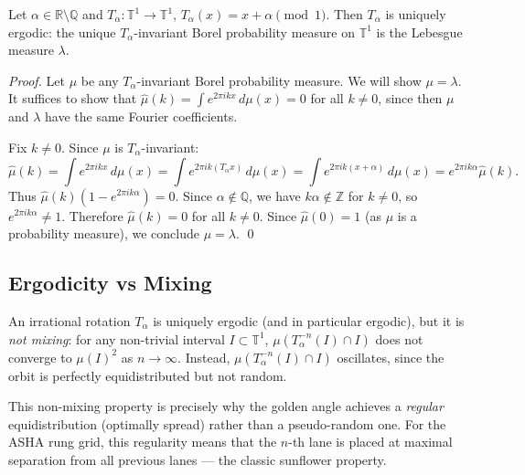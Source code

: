 \begin{theorem}\label{thm:unique-ergodic}
Let $\alpha \in \mathbb{R}\setminus\mathbb{Q}$ and $T_\alpha: \mathbb{T}^1 \to \mathbb{T}^1$,
$T_\alpha(x) = x + \alpha \pmod{1}$.
Then $T_\alpha$ is uniquely ergodic: the unique $T_\alpha$-invariant Borel probability
measure on $\mathbb{T}^1$ is the Lebesgue measure $\lambda$.
\end{theorem}

\begin{proof}
Let $\mu$ be any $T_\alpha$-invariant Borel probability measure.
We will show $\mu = \lambda$.
It suffices to show that $\hat\mu(k) = \int e^{2\pi ikx}\, d\mu(x) = 0$ for all
$k \ne 0$, since then $\mu$ and $\lambda$ have the same Fourier coefficients.

Fix $k \ne 0$.
Since $\mu$ is $T_\alpha$-invariant:
\begin{equation}
  \hat\mu(k) = \int e^{2\pi ikx}\, d\mu(x)
  = \int e^{2\pi ik(T_\alpha x)}\, d\mu(x)
  = \int e^{2\pi ik(x+\alpha)}\, d\mu(x)
  = e^{2\pi ik\alpha}\hat\mu(k).
\end{equation}
Thus $\hat\mu(k)(1 - e^{2\pi ik\alpha}) = 0$.
Since $\alpha \notin \mathbb{Q}$, we have $k\alpha \notin \mathbb{Z}$ for $k \ne 0$,
so $e^{2\pi ik\alpha} \ne 1$.
Therefore $\hat\mu(k) = 0$ for all $k \ne 0$.
Since $\hat\mu(0) = 1$ (as $\mu$ is a probability measure), we conclude $\mu = \lambda$.
\qed
\end{proof}

\subsection{Ergodicity vs Mixing}\label{subsec:ch18-mixing}

An irrational rotation $T_\alpha$ is uniquely ergodic (and in particular ergodic),
but it is \emph{not mixing}: for any non-trivial interval $I \subset \mathbb{T}^1$,
$\mu(T_\alpha^{-n}(I) \cap I)$ does not converge to $\mu(I)^2$ as $n \to \infty$.
Instead, $\mu(T_\alpha^{-n}(I) \cap I)$ oscillates, since the orbit is perfectly
equidistributed but not random.

This non-mixing property is precisely why the golden angle achieves a \emph{regular}
equidistribution (optimally spread) rather than a pseudo-random one.
For the ASHA rung grid, this regularity means that the $n$-th lane is placed at
maximal separation from all previous lanes — the classic sunflower property.

